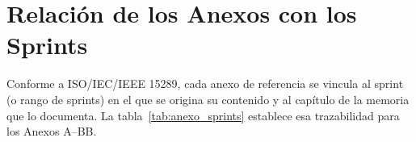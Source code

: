 \chapter*{Relación de los Anexos con los Sprints}
\label{cap:anexo_relacion}

Conforme a ISO/IEC/IEEE 15289, cada anexo de referencia se vincula al sprint (o rango de
sprints) en el que se origina su contenido y al capítulo de la memoria que lo documenta. La
tabla~\ref{tab:anexo_sprints} establece esa trazabilidad para los Anexos A--BB.\par

